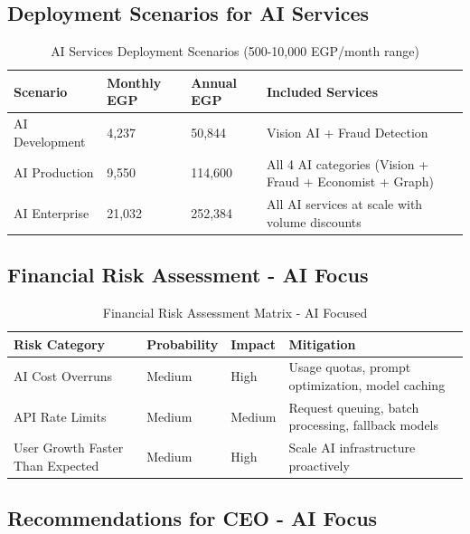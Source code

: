 \documentclass[11pt,a4paper]{article}
\begin{document}
\subsection{Deployment Scenarios for AI Services}

\begin{table}[H]
\centering
\footnotesize
\begin{tabular}{|l|l|l|l|}
\hline
\textbf{Scenario} & \textbf{Monthly EGP} & \textbf{Annual EGP} & \textbf{Included Services} \\
\hline
AI Development & 4,237 & 50,844 & Vision AI + Fraud Detection \\
AI Production & 9,550 & 114,600 & All 4 AI categories (Vision + Fraud + Economist + Graph) \\
AI Enterprise & 21,032 & 252,384 & All AI services at scale with volume discounts \\
\hline
\end{tabular}
\caption{AI Services Deployment Scenarios (500-10,000 EGP/month range)}
\end{table}

\subsection{Financial Risk Assessment - AI Focus}

\begin{table}[H]
\centering
\footnotesize
\begin{tabular}{|l|l|l|l|}
\hline
\textbf{Risk Category} & \textbf{Probability} & \textbf{Impact} & \textbf{Mitigation} \\
\hline
AI Cost Overruns & Medium & High & Usage quotas, prompt optimization, model caching \\
API Rate Limits & Medium & Medium & Request queuing, batch processing, fallback models \\
User Growth Faster Than Expected & Medium & High & Scale AI infrastructure proactively \\
\hline
\end{tabular}
\caption{Financial Risk Assessment Matrix - AI Focused}
\end{table}

\subsection{Recommendations for CEO - AI Focus}
\end{document}
